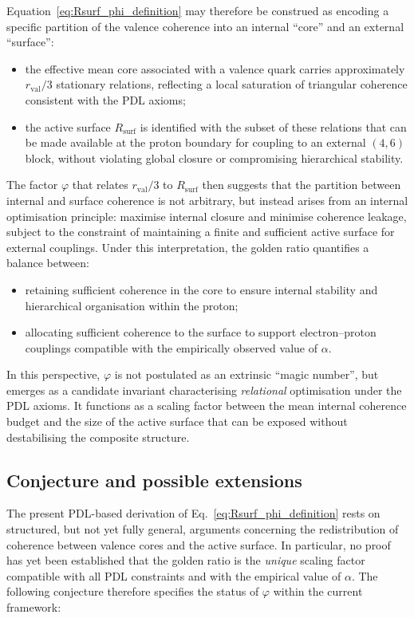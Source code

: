 \documentclass[11pt,a4paper]{article}
\numberwithin{equation}{section}
\begin{document}
Equation~\eqref{eq:Rsurf_phi_definition} may therefore be construed as encoding a specific partition of the valence coherence into an internal ``core'' and an external ``surface'':
\begin{itemize}
  \item the effective mean core associated with a valence quark carries approximately $r_{\mathrm{val}}/3$ stationary relations, reflecting a local saturation of triangular coherence consistent with the PDL axioms;
  \item the active surface $R_{\mathrm{surf}}$ is identified with the subset of these relations that can be made available at the proton boundary for coupling to an external $(4,6)$ block, without violating global closure or compromising hierarchical stability.
\end{itemize}
The factor $\varphi$ that relates $r_{\mathrm{val}}/3$ to $R_{\mathrm{surf}}$ then suggests that the partition between internal and surface coherence is not arbitrary, but instead arises from an internal optimisation principle: maximise internal closure and minimise coherence leakage, subject to the constraint of maintaining a finite and sufficient active surface for external couplings. Under this interpretation, the golden ratio quantifies a balance between:
\begin{itemize}
  \item retaining sufficient coherence in the core to ensure internal stability and hierarchical organisation within the proton;
  \item allocating sufficient coherence to the surface to support electron--proton couplings compatible with the empirically observed value of $\alpha$.
\end{itemize}

In this perspective, $\varphi$ is not postulated as an extrinsic ``magic number'', but emerges as a candidate invariant characterising \emph{relational} optimisation under the PDL axioms. It functions as a scaling factor between the mean internal coherence budget and the size of the active surface that can be exposed without destabilising the composite structure.

\subsection{Conjecture and possible extensions}
\label{subsec:phi_conjecture}

The present PDL-based derivation of Eq.~\eqref{eq:Rsurf_phi_definition} rests on structured, but not yet fully general, arguments concerning the redistribution of coherence between valence cores and the active surface. In particular, no proof has yet been established that the golden ratio is the \emph{unique} scaling factor compatible with all PDL constraints and with the empirical value of $\alpha$. The following conjecture therefore specifies the status of $\varphi$ within the current framework:
\end{document}
